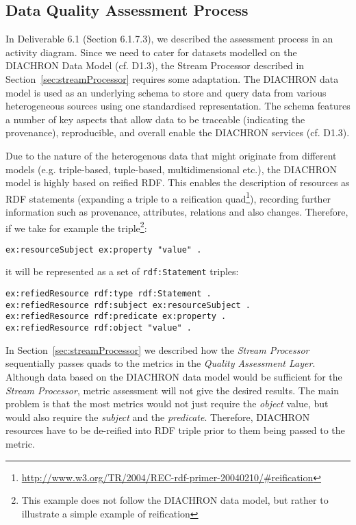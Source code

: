 
\subsection{Data Quality Assessment Process}
\label{sec:DQAssessment} 
In Deliverable 6.1 (Section 6.1.7.3), we described the assessment process in an activity diagram.
Since we need to cater for datasets modelled on the DIACHRON Data Model (cf. D1.3), the Stream Processor described in Section~\ref{sec:streamProcessor} requires some adaptation.
The DIACHRON data model is used as an underlying schema to store and query data from various heterogeneous sources using one standardised representation.
The schema features a number of key aspects that allow data to be traceable (indicating the provenance), reproducible, and overall enable the DIACHRON services (cf. D1.3).

Due to the nature of the heterogenous data that might originate from different models (e.g. triple-based, tuple-based, multidimensional etc.), the DIACHRON model is highly based on reified RDF.
This enables the description of resources as RDF statements (expanding a triple to a reification quad\footnote{\url{http://www.w3.org/TR/2004/REC-rdf-primer-20040210/#reification}}), recording further information such as provenance, attributes, relations and also changes.
Therefore, if we take for example the triple\footnote{This example does not follow the DIACHRON data model, but rather to illustrate a simple example of reification}:
\begin{lstlisting}[language=N3]
ex:resourceSubject ex:property "value" .
\end{lstlisting}
it will be represented as a set of \texttt{rdf:Statement} triples:
\begin{lstlisting}[language=N3]
ex:refiedResource rdf:type rdf:Statement .
ex:refiedResource rdf:subject ex:resourceSubject .
ex:refiedResource rdf:predicate ex:property .
ex:refiedResource rdf:object "value" .
\end{lstlisting}

In Section~\ref{sec:streamProcessor} we described how the \emph{Stream Processor} sequentially passes quads to the metrics in the \emph{Quality Assessment Layer}.
Although data based on the DIACHRON data model would be sufficient for the \emph{Stream Processor}, metric assessment will not give the desired results.
The main problem is that the most metrics would not just require the \emph{object} value, but would also require the \emph{subject} and the \emph{predicate}.
Therefore, DIACHRON resources have to be de-reified into RDF triple prior to them being passed to the metric.

